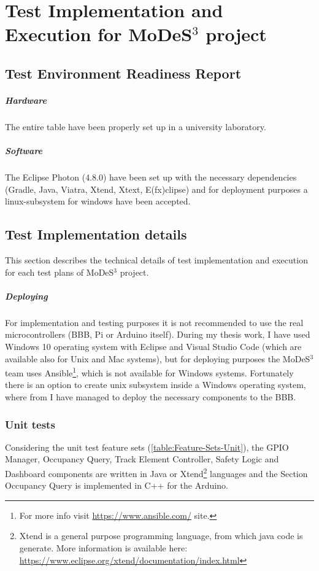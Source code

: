 \chapter{Test Implementation and Execution for MoDeS$^3$ project}\label{TestImpl:MODES}

\section{Test Environment Readiness Report}
\paragraph{Hardware} The entire table have been properly set up in a university laboratory.
\paragraph{Software} The Eclipse Photon (4.8.0) have been set up with the necessary dependencies (Gradle, Java, Viatra, Xtend, Xtext, E(fx)clipse) and for deployment purposes a linux-subsystem for windows have been accepted.

\section{Test Implementation details}
This section describes the technical details of test implementation and execution for each test plans of MoDeS$^3$ project.
\paragraph{Deploying} For implementation and testing purposes it is not recommended to use the real microcontrollers (BBB, Pi or Arduino itself). During my thesis work, I have used Windows 10 operating system with Eclipse and Visual Studio Code (which are available also for Unix and Mac systems), but for deploying purposes the MoDeS$^3$ team uses Ansible\footnote{For more info visit \url{https://www.ansible.com/} site.}, which is not available for Windows systems. Fortunately there is an option to create unix subsystem inside a Windows operating system, where from I have managed to deploy the necessary components to the BBB.

\subsection{Unit tests} Considering the unit test feature sets (\autoref{table:Feature-Sets-Unit}), the GPIO Manager, Occupancy Query, Track Element Controller, Safety Logic and Dashboard components are written in Java or Xtend\footnote{Xtend is a general purpose programming language, from which java code is generate. More information is available here: \url{https://www.eclipse.org/xtend/documentation/index.html}} languages and the Section Occupancy Query is implemented in C++ for the Arduino. 


